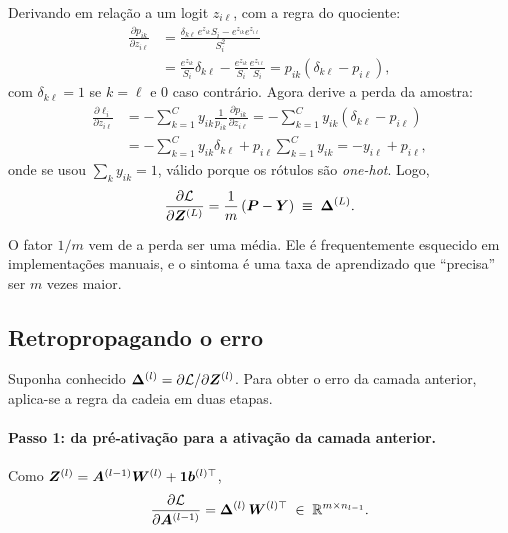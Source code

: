 Derivando em relação a um logit $z_{i\ell}$, com a regra do quociente:
\begin{align}
	\frac{\partial p_{ik}}{\partial z_{i\ell}}
	&= \frac{\delta_{k\ell}\,e^{z_{ik}}S_i - e^{z_{ik}}e^{z_{i\ell}}}{S_i^2} \nonumber\\
	&= \frac{e^{z_{ik}}}{S_i}\delta_{k\ell} - \frac{e^{z_{ik}}}{S_i}\frac{e^{z_{i\ell}}}{S_i}
	= p_{ik}\left(\delta_{k\ell} - p_{i\ell}\right),
	\label{eq:ap-jacobiano}
\end{align}
com $\delta_{k\ell}=1$ se $k=\ell$ e $0$ caso contrário. Agora derive a perda da amostra:
\begin{align}
	\frac{\partial \ell_i}{\partial z_{i\ell}}
	&= -\sum_{k=1}^{C} y_{ik}\frac{1}{p_{ik}}\frac{\partial p_{ik}}{\partial z_{i\ell}}
	= -\sum_{k=1}^{C} y_{ik}\left(\delta_{k\ell} - p_{i\ell}\right) \nonumber\\
	&= -\sum_{k=1}^{C} y_{ik}\delta_{k\ell} + p_{i\ell}\sum_{k=1}^{C} y_{ik}
	= -y_{i\ell} + p_{i\ell},
	\label{eq:ap-pmenosy}
\end{align}
onde se usou $\sum_k y_{ik}=1$, válido porque os rótulos são \emph{one-hot}. Logo,
\begin{equation}
	\frac{\partial \mathcal{L}}{\partial \bm{Z}^{(L)}} = \frac{1}{m}\left(\bm{P} - \bm{Y}\right) \;\equiv\; \bm{\Delta}^{(L)}.
	\label{eq:ap-deltaL}
\end{equation}

O fator $1/m$ vem de a perda ser uma média. Ele é frequentemente esquecido em implementações
manuais, e o sintoma é uma taxa de aprendizado que ``precisa'' ser $m$ vezes maior.

\subsection{Retropropagando o erro}

Suponha conhecido $\bm{\Delta}^{(l)} = \partial\mathcal{L}/\partial\bm{Z}^{(l)}$. Para obter o erro da
camada anterior, aplica-se a regra da cadeia em duas etapas.

\paragraph{Passo 1: da pré-ativação para a ativação da camada anterior.} Como
$\bm{Z}^{(l)} = \bm{A}^{(l-1)}\bm{W}^{(l)} + \mathbf{1}\bm{b}^{(l)\top}$,
\begin{equation}
	\frac{\partial \mathcal{L}}{\partial \bm{A}^{(l-1)}} = \bm{\Delta}^{(l)}\,\bm{W}^{(l)\top}
	\;\in\; \mathbb{R}^{m\times n_{l-1}}.
	\label{eq:ap-dA}
\end{equation}

